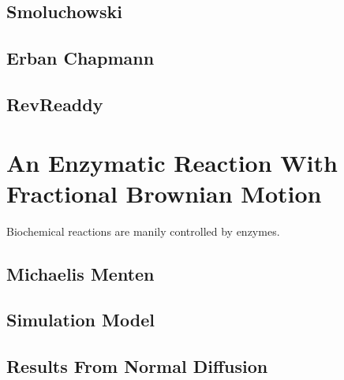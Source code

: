 \documentclass[
  a4paper,BCOR10mm,oneside,
  bibtotoc,idxtotoc,
  headsepline,footsepline,%
  fleqn,openbib
]{scrbook}
\begin{document}
\section{Smoluchowski}
\section{Erban Chapmann}
\section{RevReaddy}
\chapter{An Enzymatic Reaction With Fractional Brownian Motion}
Biochemical reactions are manily controlled by enzymes.
\section{Michaelis Menten}
\section{Simulation Model}
\section{Results From Normal Diffusion}
\end{document}
